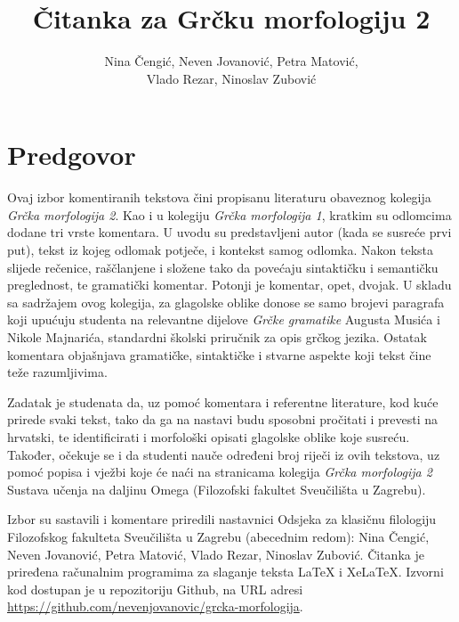 \documentclass[a4paper,12pt,twoside]{report}
\newcommand{\subtitle}[1]{%
  \posttitle{%
    \par\end{center}
    \begin{center}\large#1\end{center}
    \vskip0.5em}%
}
\begin{document}
\title{Čitanka za Grčku morfologiju 2}
\author{Nina Čengić, Neven Jovanović, Petra Matović,\\Vlado Rezar, Ninoslav Zubović}
\date{}
\maketitle

\clearpage

\tableofcontents

\thispagestyle{empty}




\chapter*{Predgovor}
\label{chap:predgovor}

Ovaj izbor komentiranih tekstova čini propisanu literaturu obaveznog kolegija \textit{Grčka morfologija 2}. Kao i u kolegiju \textit{Grčka morfologija 1}, kratkim su odlomcima dodane tri vrste komentara. U uvodu su predstavljeni autor (kada se susreće prvi put), tekst iz kojeg odlomak potječe, i kontekst samog odlomka. Nakon teksta slijede rečenice, raščlanjene i složene tako da povećaju sintaktičku i semantičku preglednost, te gramatički komentar. Potonji je komentar, opet, dvojak. U skladu sa sadržajem ovog kolegija, za glagolske oblike donose se samo brojevi paragrafa koji upućuju studenta na relevantne dijelove \textit{Grčke gramatike} Augusta Musića i Nikole Majnarića, standardni školski priručnik za opis grčkog jezika. Ostatak komentara objašnjava gramatičke, sintaktičke i stvarne aspekte koji tekst čine teže razumljivima.

Zadatak je studenata da, uz pomoć komentara i referentne literature, kod kuće prirede svaki tekst, tako da ga na nastavi budu sposobni pročitati i prevesti na hrvatski, te identificirati i morfološki opisati glagolske oblike koje susreću. Također, očekuje se i da studenti nauče određeni broj riječi iz ovih tekstova, uz pomoć popisa i vježbi koje će naći na stranicama kolegija \textit{Grčka morfologija 2} Sustava učenja na daljinu Omega (Filozofski fakultet Sveučilišta u Zagrebu).


Izbor su sastavili i komentare priredili nastavnici Odsjeka za klasičnu filologiju Filozofskog fakulteta Sveučilišta u Zagrebu (abecednim redom): Nina Čengić, Neven Jovanović, Petra Matović, Vlado Rezar, Ninoslav Zubović. Čitanka je priređena računalnim programima za slaganje teksta LaTeX i XeLaTeX. Izvorni kod dostupan je u repozitoriju Github, na URL adresi \url{https://github.com/nevenjovanovic/grcka-morfologija}.
\end{document}
